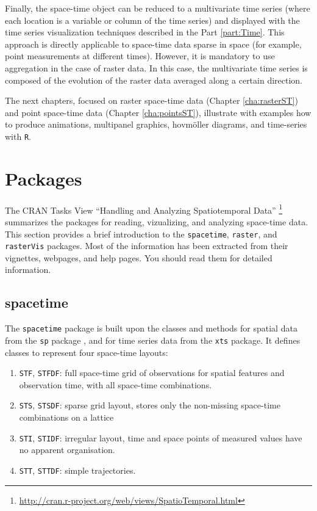 \documentclass[smallroyalvopaper]{memoir}
\begin{document}
Finally, the space-time object can be reduced to a multivariate time series (where each location is a variable or column of the time series) and displayed with the time series visualization techniques described in the Part \ref{part:Time}. This approach is directly applicable to space-time data sparse in space (for example, point measurements at different times). However, it is mandatory to use aggregation in the case of raster data. In this case, the multivariate time series is composed of the evolution of the raster data averaged along a certain direction.

The next chapters, focused on raster space-time data (Chapter \ref{cha:rasterST}) and point space-time data (Chapter \ref{cha:pointsST}), illustrate with examples how to produce animations, multipanel graphics, hovmöller diagrams, and time-series with \texttt{R}.

\section{Packages}
\label{sec:org9958585}
\label{sec:spacetime-packages}

The CRAN Tasks View ``Handling and Analyzing Spatiotemporal Data'' \footnote{\url{http://cran.r-project.org/web/views/SpatioTemporal.html}} summarizes the packages for reading, vizualizing, and analyzing space-time data. This section provides a brief introduction to the \texttt{spacetime}, \texttt{raster}, and \texttt{rasterVis} packages. Most of the information has been extracted from their vignettes, webpages, and help pages. You should read them for detailed information.

\subsection{spacetime}
\label{sec:org2a5b9ea}
\label{sec:spacetime}

The \texttt{spacetime} package \cite{Pebesma2012} is built upon the classes and methods for spatial data from the \texttt{sp} package , and for time series data from the \texttt{xts} package. It defines classes to represent four space-time layouts:

\begin{enumerate}
\item \texttt{STF}, \texttt{STFDF}: full space-time grid of observations for spatial features and observation time, with all space-time combinations.

\item \texttt{STS}, \texttt{STSDF}: sparse grid layout, stores only the non-missing space-time combinations on a lattice

\item \texttt{STI}, \texttt{STIDF}: irregular layout, time and space points of measured values have no apparent organisation.

\item \texttt{STT}, \texttt{STTDF}: simple trajectories.
\end{enumerate}
\end{document}
